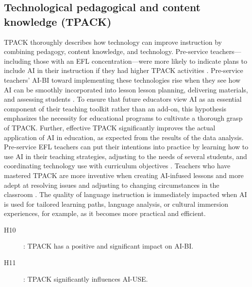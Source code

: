 \documentclass[english]{textolivre}
\begin{document}
\subsection{Technological pedagogical and content knowledge (TPACK)}\label{sec-organizacao-latex}
TPACK thoroughly describes how technology can improve instruction by combining pedagogy, content knowledge, and technology. Pre-service teachers—including those with an EFL concentration—were more likely to indicate plans to include AI in their instruction if they had higher TPACK activities \cite{an2023ai,habibi2020tpack,mailizar2021tpack,sofyan2023tpack}. Pre-service teachers’ AI-BI toward implementing these technologies rise when they see how AI can be smoothly incorporated into lesson lesson planning, delivering materials, and assessing students \cite{an2023ai,mailizar2021tpack}. To ensure that future educators view AI as an essential component of their teaching toolkit rather than an add-on, this hypothesis emphasizes the necessity for educational programs to cultivate a thorough grasp of TPACK. Further, effective TPACK significantly improves the actual application of AI in education, as expected from the results of the data analysis. Pre-service EFL teachers can put their intentions into practice by learning how to use AI in their teaching strategies, adjusting to the needs of several students, and coordinating technology use with curriculum objectives \cite{an2023ai,habibi2020tpack,mailizar2021tpack,sofyan2023tpack}. Teachers who have mastered TPACK are more inventive when creating AI-infused lessons and more adept at resolving issues and adjusting to changing circumstances in the classroom \cite{an2023ai,habibi2020tpack,mailizar2021tpack}. The quality of language instruction is immediately impacted when AI is used for tailored learning paths, language analysis, or cultural immersion experiences, for example, as it becomes more practical and efficient.

\begin{description}
    \item[H10]: TPACK has a positive and significant impact on AI-BI.
    \item[H11]: TPACK significantly influences AI-USE.
\end{description}
\end{document}
